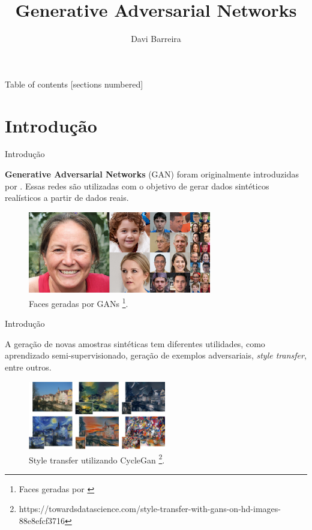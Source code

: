 \documentclass[10pt]{beamer}
\title{Generative Adversarial Networks}
\subtitle{}
\date{}
\author{Davi Barreira}
\institute{FGV - Escola de Matemática Aplicada}
\begin{document}
\maketitle

\begin{frame}{Table of contents}
  [sections numbered]
  \tableofcontents[hideallsubsections]
\end{frame}

\AtBeginSection{}
\section[Introdução]{Introdução}
\begin{frame}[fragile]{Introdução}

	\textbf{Generative Adversarial Networks} (GAN)
	foram originalmente introduzidas por \citet{goodfellow2014}.
	Essas redes são utilizadas com o objetivo de gerar
	dados sintéticos realísticos a partir de dados reais.

    \begin{figure}[H]
        \centering
        \includegraphics[width=8cm]{images/gans-faces.png}
        \caption{Faces geradas por GANs
        \footnote{Faces geradas por \citet{karras2018}}.}
    \end{figure}

\end{frame}

\begin{frame}[fragile]{Introdução}

	A geração de novas amostras sintéticas tem diferentes utilidades,
	como aprendizado semi-supervisionado, geração de exemplos
	adversariais, \textit{style transfer}, entre outros.

    \begin{figure}[H]
        \centering
        \includegraphics[width=6cm]{images/style-transfer.jpeg}
        \caption{Style transfer utilizando CycleGan
        \footnote{https://towardsdatascience.com/style-transfer-with-gans-on-hd-images-88e8efcf3716}.}
    \end{figure}


\end{frame}
\end{document}
